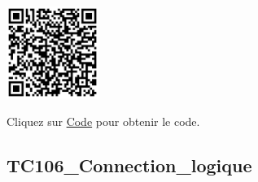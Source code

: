 \documentclass[a4paper,12pt]{report}
\begin{document}
\begin{minipage}{0.5\textwidth}
    \includegraphics[height=3cm]{Code TC105.png}
\end{minipage}%
\begin{minipage}{0.5\textwidth}
    Cliquez sur \href{https://github.com/DexterTaha/Controllino-PLC-Sample/blob/main/TC100/TC105_Circuit_de_croisement/TC105_Circuit_de_croisement.ino}{Code} pour obtenir le code.
\end{minipage}

\newpage
\subsection{TC106\_Connection\_logique}
\begin{center}
\label{}
\end{center}
\end{document}
